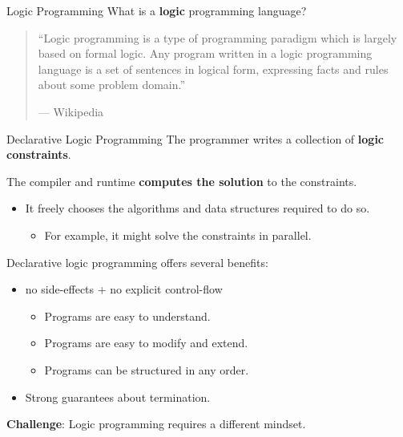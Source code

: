 \begin{frame}{Logic Programming}
What is a \textbf{logic} programming language?

\bigskip

\begin{quote}
``Logic programming is a type of programming paradigm which is largely based on
formal logic. Any program written in a logic programming language is a set of
sentences in logical form, expressing facts and rules about some problem
domain.''
\begin{flushright}
--- Wikipedia
\end{flushright}
\end{quote}
\end{frame}

\begin{frame}{Declarative Logic Programming}
The programmer writes a collection of \textbf{logic constraints}.

\pause

The compiler and runtime \textbf{computes the solution} to the constraints.

\begin{itemize}
    \item It freely chooses the algorithms and data structures required to do so.
    \begin{itemize}
        \item For example, it might solve the constraints in parallel.
    \end{itemize}
\end{itemize}

\pause

Declarative logic programming offers several benefits:

\begin{itemize}
    \pause \item no side-effects + no explicit control-flow
    \begin{itemize}
        \item Programs are easy to understand.
        \item Programs are easy to modify and extend.
        \item Programs can be structured in any order.
    \end{itemize}
    \pause \item Strong guarantees about termination.
\end{itemize}

\pause

\textbf{Challenge}: Logic programming requires a different mindset.
\end{frame}

